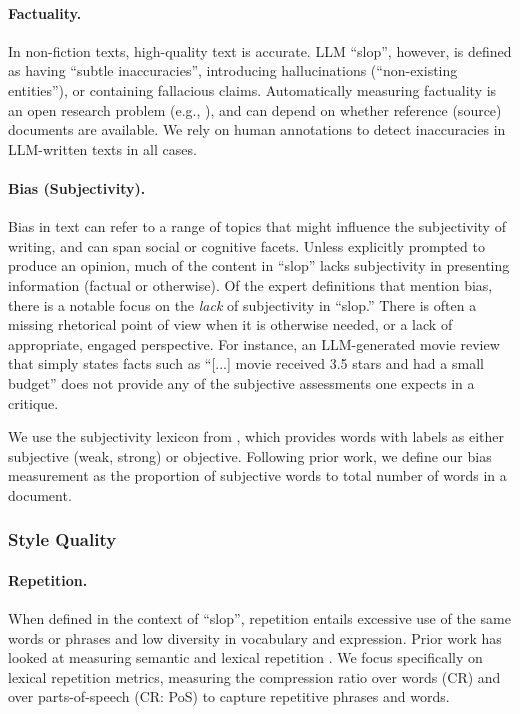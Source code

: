 \documentclass{article} %
\begin{document}
\paragraph{Factuality.} In non-fiction texts, high-quality text is accurate. 
LLM ``slop'', however, is defined as having ``subtle inaccuracies'', introducing hallucinations (``non-existing entities''), or containing fallacious claims. 
Automatically measuring factuality is an open research problem (e.g., \citealt{ramprasad2025do}), and can depend on whether reference (source) documents are available.
We rely on human annotations to detect inaccuracies in LLM-written texts in all cases.

\paragraph{Bias (Subjectivity).} Bias in text can refer to a range of topics that might influence the subjectivity of writing, and can span social \citep{Blodgett2020LanguageI} or cognitive \citep{atreides2024cognitive} facets. 
Unless explicitly prompted to produce an opinion, much of the content in ``slop'' lacks subjectivity in presenting information (factual or otherwise). 
Of the expert definitions that mention bias, there is a notable focus on the \textit{lack} of subjectivity in ``slop.'' 
There is often a missing rhetorical point of view when it is otherwise needed, or a lack of appropriate, engaged perspective. 
For instance, an LLM-generated movie review that simply states facts such as ``[...] movie received 3.5 stars and had a small budget'' does not provide any of the subjective assessments one expects in a critique. 

We use the subjectivity lexicon from \citet{10.1162/0891201041850885}, which provides words with labels as either subjective (weak, strong) or objective. 
Following prior work, we define our bias measurement as the proportion of subjective words to total number of words in a document. 

\subsubsection*{\textcolor{stylequality}{Style Quality}}
\paragraph{Repetition.}
 When defined in the context of ``slop'', repetition entails excessive use of the same words or phrases and low diversity in vocabulary and expression. 
Prior work has looked at measuring semantic \citep{Tevet2020EvaluatingTE, namuduri2025qudsim} and lexical repetition \citep{shaib2024standardizing}. We focus specifically on lexical repetition metrics, measuring the compression ratio over words (CR) and over parts-of-speech (CR: PoS) to capture repetitive phrases and words.
\end{document}
